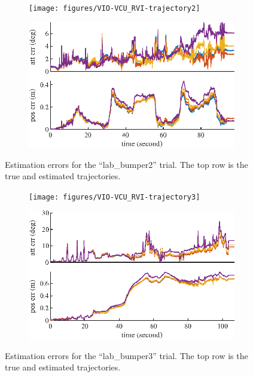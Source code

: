 \begin{figure}
	\centering
	\begin{subfigure}{\textwidth}
		\centering
		\texttt{[image: figures/VIO-VCU\_RVI-trajectory2]}
	\end{subfigure}
	\begin{subfigure}{\textwidth}
		\centering
		\vspace{1cm}
		\includegraphics[scale=1.3]{figures/VIO-VCU_RVI-error2}
	\end{subfigure}
	\caption{Estimation errors for the ``lab\_bumper2'' trial. The top row is the true and estimated trajectories.}
	\label{fig:VIO-dataset2}
\end{figure}

\begin{figure}
	\centering
	\begin{subfigure}{\textwidth}
		\centering
		\texttt{[image: figures/VIO-VCU\_RVI-trajectory3]}
	\end{subfigure}
	\begin{subfigure}{\textwidth}
		\centering
		\vspace{1cm}
		\includegraphics[scale=1.3]{figures/VIO-VCU_RVI-error3}
	\end{subfigure}
	\caption{Estimation errors for the ``lab\_bumper3'' trial. The top row is the true and estimated trajectories.}
	\label{fig:VIO-dataset3}
\end{figure}

